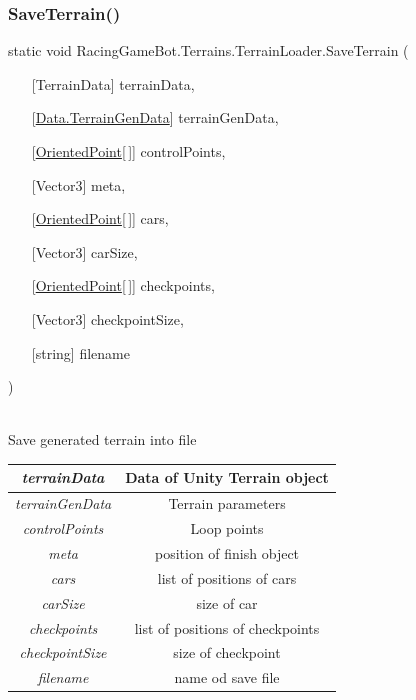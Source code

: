 \subsubsection{\texorpdfstring{SaveTerrain()}{SaveTerrain()}}
{\footnotesize\ttfamily static void RacingGameBot.Terrains.TerrainLoader.SaveTerrain (\begin{itemize}
    \item[] [{TerrainData}]{ terrainData, }
    \item[] [{\mbox{\hyperlink{classRacingGameBot_1_1Data_1_1TerrainGenData}{Data.TerrainGenData}}}]{ terrainGenData, }
    \item[] [{\mbox{\hyperlink{classRacingGameBot_1_1Terrains_1_1OrientedPoint}{OrientedPoint}}\mbox{[}$\,$\mbox{]}}]{ controlPoints, }
    \item[] [{Vector3}]{ meta, }
    \item[] [{\mbox{\hyperlink{classRacingGameBot_1_1Terrains_1_1OrientedPoint}{OrientedPoint}}\mbox{[}$\,$\mbox{]}}]{ cars, }
    \item[] [{Vector3}]{ carSize, }
    \item[] [{\mbox{\hyperlink{classRacingGameBot_1_1Terrains_1_1OrientedPoint}{OrientedPoint}}\mbox{[}$\,$\mbox{]}}]{ checkpoints, }
    \item[] [{Vector3}]{ checkpointSize, }
    \item[] [{string}]{ filename }
\end{itemize}\hspace{0.5cm})}\\
Save generated terrain into file \\
\begin{tabular}{|c|c|}
\hline
{\em terrainData} & Data of Unity Terrain object\\
\hline
{\em terrainGenData} & Terrain parameters\\
\hline
{\em controlPoints} & Loop points\\
\hline
{\em meta} & position of finish object\\
\hline
{\em cars} & list of positions of cars\\
\hline
{\em carSize} & size of car\\
\hline
{\em checkpoints} & list of positions of checkpoints\\
\hline
{\em checkpointSize} & size of checkpoint\\
\hline
{\em filename} & name od save file\\
\hline
\end{tabular}
